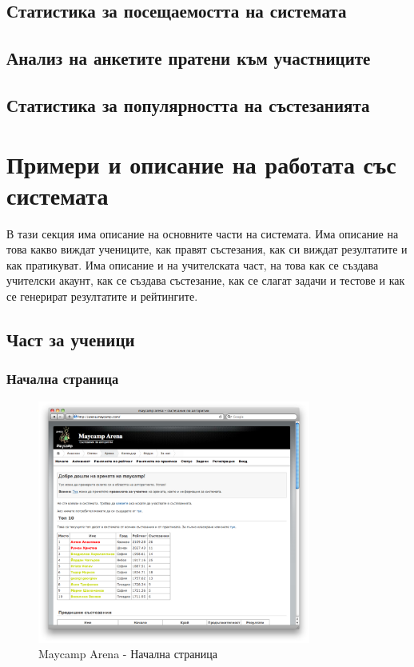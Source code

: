 \documentclass[a4paper,12pt]{article}
\begin{document}
  \subsection{Статистика за посещаемостта на системата}
  \subsection{Анализ на анкетите пратени към участниците}
  \subsection{Статистика за популярността на състезанията}
  \section{Примери и описание на работата със системата}
  В тази секция има описание на основните части на системата. Има описание на това какво виждат учениците, как правят състезания, как си виждат резултатите и как пратикуват. Има описание и на учителската част, на това как се създава учителски акаунт, как се създава състезание, как се слагат задачи и тестове и как се генерират резултатите и рейтингите.
  \subsection{Част за ученици}
  \subsubsection{Начална страница}
  \begin{figure}[ht]
    \begin{center}
      \includegraphics[width=0.8\textwidth]{maycamp_arena_home.png}
    \end{center}
    \caption{Maycamp Arena - Начална страница}
    \label{arena_homepage}
  \end{figure}
\end{document}
